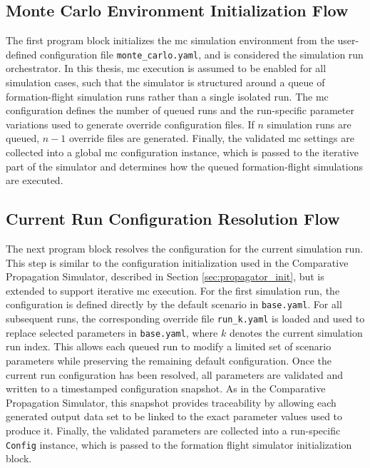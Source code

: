 \subsection{Monte Carlo Environment Initialization Flow}
The first program block initializes the \gls{mc} simulation environment from the user-defined configuration file \texttt{monte\_carlo.yaml}, and is considered the simulation run orchestrator. In this thesis, \gls{mc} execution is assumed to be enabled for all simulation cases, such that the simulator is structured around a queue of formation-flight simulation runs rather than a single isolated run. The \gls{mc} configuration defines the number of queued runs and the run-specific parameter variations used to generate override configuration files. If $n$ simulation runs are queued, $n-1$ override files are generated. Finally, the validated \gls{mc} settings are collected into a global \gls{mc} configuration instance, which is passed to the iterative part of the simulator and determines how the queued formation-flight simulations are executed.


\subsection{Current Run Configuration Resolution Flow}
The next program block resolves the configuration for the current simulation run. This step is similar to the configuration initialization used in the Comparative Propagation Simulator, described in Section \ref{sec:propagator_init}, but is extended to support iterative \gls{mc} execution. For the first simulation run, the configuration is defined directly by the default scenario in \texttt{base.yaml}. For all subsequent runs, the corresponding override file \texttt{run\_k.yaml} is loaded and used to replace selected parameters in \texttt{base.yaml}, where $k$ denotes the current simulation run index. This allows each queued run to modify a limited set of scenario parameters while preserving the remaining default configuration. Once the current run configuration has been resolved, all parameters are validated and written to a timestamped configuration snapshot. As in the Comparative Propagation Simulator, this snapshot provides traceability by allowing each generated output data set to be linked to the exact parameter values used to produce it. Finally, the validated parameters are collected into a run-specific \texttt{Config} instance, which is passed to the formation flight simulator initialization block.


